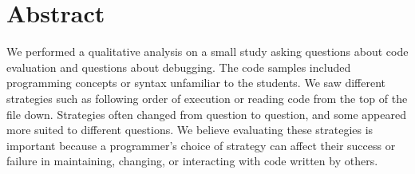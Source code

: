 \section{Abstract}
We performed a qualitative analysis on a small study asking questions about code evaluation and questions about debugging.
The code samples included programming concepts or syntax unfamiliar to the students.
We saw different strategies such as following order of execution or reading code from the top of the file down. Strategies often changed from question to question, and some appeared more suited to different questions.
We believe evaluating these strategies is important because a programmer's choice of strategy can affect their success or failure in maintaining, changing, or interacting with code written by others.


\newpage